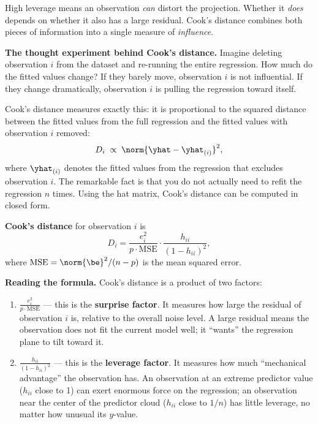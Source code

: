 High leverage means an observation \emph{can} distort the projection.
Whether it \emph{does} depends on whether it also has a large residual.
Cook's distance combines both pieces of information into a single measure of \emph{influence}.

\medskip
\noindent\textbf{The thought experiment behind Cook's distance.}
Imagine deleting observation $i$ from the dataset and re-running the entire regression.
How much do the fitted values change?
If they barely move, observation $i$ is not influential.
If they change dramatically, observation $i$ is pulling the regression toward itself.

Cook's distance measures exactly this: it is proportional to the squared distance between the fitted values from the full regression and the fitted values with observation $i$ removed:
\[
  D_i \;\propto\; \norm{\yhat - \yhat_{(i)}}^2,
\]
where $\yhat_{(i)}$ denotes the fitted values from the regression that excludes observation $i$.
The remarkable fact is that you do not actually need to refit the regression $n$ times.
Using the hat matrix, Cook's distance can be computed in closed form.

\begin{definition}
\textbf{Cook's distance} for observation $i$ is
\[
  D_i = \frac{e_i^2}{p\cdot\text{MSE}}
        \cdot \frac{h_{ii}}{(1 - h_{ii})^2},
\]
where $\text{MSE} = \norm{\be}^2/(n-p)$ is the mean squared error.
\end{definition}

\noindent\textbf{Reading the formula.}
Cook's distance is a product of two factors:
\begin{enumerate}[nosep]
  \item $\frac{e_i^2}{p\cdot\text{MSE}}$ --- this is the \textbf{surprise factor}.
    It measures how large the residual of observation $i$ is, relative to the overall noise level.
    A large residual means the observation does not fit the current model well; it ``wants'' the regression plane to tilt toward it.
  \item $\frac{h_{ii}}{(1 - h_{ii})^2}$ --- this is the \textbf{leverage factor}.
    It measures how much ``mechanical advantage'' the observation has.
    An observation at an extreme predictor value ($h_{ii}$ close to 1) can exert enormous force on the regression; an observation near the center of the predictor cloud ($h_{ii}$ close to $1/n$) has little leverage, no matter how unusual its $y$-value.
\end{enumerate}

